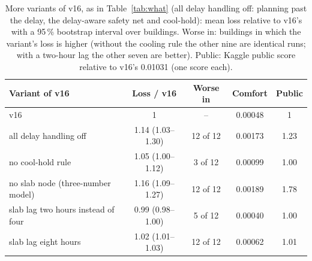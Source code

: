 \documentclass{article}
\begin{document}
\begin{table}[!htb]\centering
\caption{More variants of v16, as in Table~\ref{tab:what} (all delay handling off: planning past the delay, the delay-aware
safety net and cool-hold): mean loss relative to v16's with a 95\,\% bootstrap interval over buildings. Worse in: buildings in which the variant's loss is higher (without the cooling rule the other nine are identical runs; with a two-hour lag the other seven are better). Public: Kaggle public score relative to v16's 0.01031 (one score
each).}\label{tab:what2}
\small
\begin{tabular}{lcccc}\toprule
Variant of v16 & Loss / v16 & Worse in & Comfort & Public\\\midrule
v16 & 1 & -- & 0.00048 & 1\\
all delay handling off & 1.14 (1.03--1.30) & 12 of 12 & 0.00173 & 1.23\\
no cool-hold rule & 1.05 (1.00--1.12) & 3 of 12 & 0.00099 & 1.00\\
no slab node (three-number model) & 1.16 (1.09--1.27) & 12 of 12 & 0.00189 & 1.78\\
slab lag two hours instead of four & 0.99 (0.98--1.00) & 5 of 12 & 0.00040 & 1.00\\
slab lag eight hours & 1.02 (1.01--1.03) & 12 of 12 & 0.00062 & 1.01\\\bottomrule
\end{tabular}
\end{table}
\end{document}
